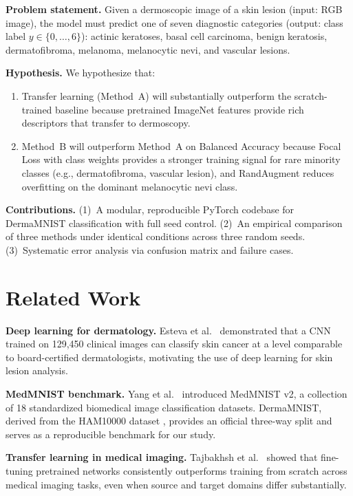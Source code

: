 \documentclass[conference]{IEEEtran}
\begin{document}
\textbf{Problem statement.}
Given a dermoscopic image of a skin lesion (input: RGB image), the
model must predict one of seven diagnostic categories (output:
class label $y \in \{0,\ldots,6\}$): actinic keratoses,
basal cell carcinoma, benign keratosis, dermatofibroma, melanoma,
melanocytic nevi, and vascular lesions.

\textbf{Hypothesis.}
We hypothesize that:
\begin{enumerate}
  \item Transfer learning (Method~A) will substantially outperform
        the scratch-trained baseline because pretrained ImageNet
        features provide rich descriptors that transfer to dermoscopy.
  \item Method~B will outperform Method~A on Balanced Accuracy because
        Focal Loss with class weights provides a stronger training
        signal for rare minority classes (e.g., dermatofibroma,
        vascular lesion), and RandAugment reduces overfitting on the
        dominant melanocytic nevi class.
\end{enumerate}

\textbf{Contributions.}
(1)~A modular, reproducible PyTorch codebase for DermaMNIST
classification with full seed control.
(2)~An empirical comparison of three methods under identical
conditions across three random seeds.
(3)~Systematic error analysis via confusion matrix and failure cases.

\section{Related Work}

\textbf{Deep learning for dermatology.}
Esteva et al.~\cite{esteva2017dermatologist} demonstrated that a CNN
trained on 129,450 clinical images can classify skin cancer at
a level comparable to board-certified dermatologists, motivating the
use of deep learning for skin lesion analysis.

\textbf{MedMNIST benchmark.}
Yang et al.~\cite{yang2023medmnist} introduced MedMNIST v2, a
collection of 18 standardized biomedical image classification
datasets. DermaMNIST, derived from the HAM10000 dataset
\cite{tschandl2018ham10000}, provides an official three-way split
and serves as a reproducible benchmark for our study.

\textbf{Transfer learning in medical imaging.}
Tajbakhsh et al.~\cite{tajbakhsh2016convolutional} showed that
fine-tuning pretrained networks consistently outperforms training
from scratch across medical imaging tasks, even when source and
target domains differ substantially.
\end{document}
